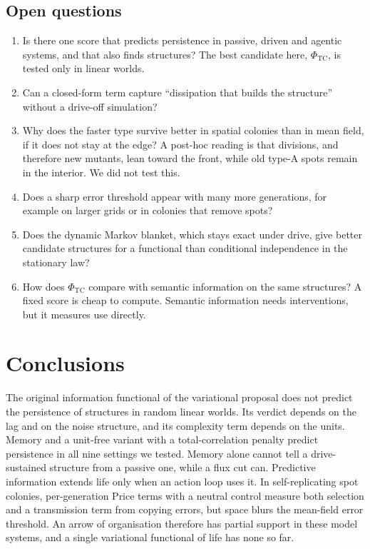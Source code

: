 \documentclass[11pt]{article}
\newcommand{\PhiTC}{\Phi_{\mathrm{TC}}}
\begin{document}
\subsection{Open questions}
\begin{enumerate}
  \item Is there one score that predicts persistence in passive, driven and agentic systems, and that also finds
  structures? The best candidate here, $\PhiTC$, is tested only in linear worlds.
  \item Can a closed-form term capture ``dissipation that builds the structure'' without a drive-off simulation?
  \item Why does the faster type survive better in spatial colonies than in mean field, if it does not stay at the edge?
  A post-hoc reading is that divisions, and therefore new mutants, lean toward the front, while old type-A spots remain
  in the interior. We did not test this.
  \item Does a sharp error threshold appear with many more generations, for example on larger grids or in colonies
  that remove spots?
  \item Does the dynamic Markov blanket, which stays exact under drive, give better candidate structures for a
  functional than conditional independence in the stationary law?
  \item How does $\PhiTC$ compare with semantic information \cite{KolchinskyWolpert18,Bartlett25} on the same
  structures? A fixed score is cheap to compute. Semantic information needs interventions, but it measures use directly.
\end{enumerate}

\section{Conclusions}
The original information functional of the variational proposal does not predict the persistence of structures in
random linear worlds. Its verdict depends on the lag and on the noise structure, and its complexity term depends on the
units. Memory and a unit-free variant with a total-correlation penalty predict persistence in all nine settings we
tested. Memory alone cannot tell a drive-sustained structure from a passive one, while a flux cut can. Predictive
information extends life only when an action loop uses it. In self-replicating spot colonies, per-generation Price
terms with a neutral control measure both selection and a transmission term from copying errors, but space blurs the
mean-field error threshold. An arrow of organisation therefore has partial support in these model systems, and a single
variational functional of life has none so far.
\end{document}

